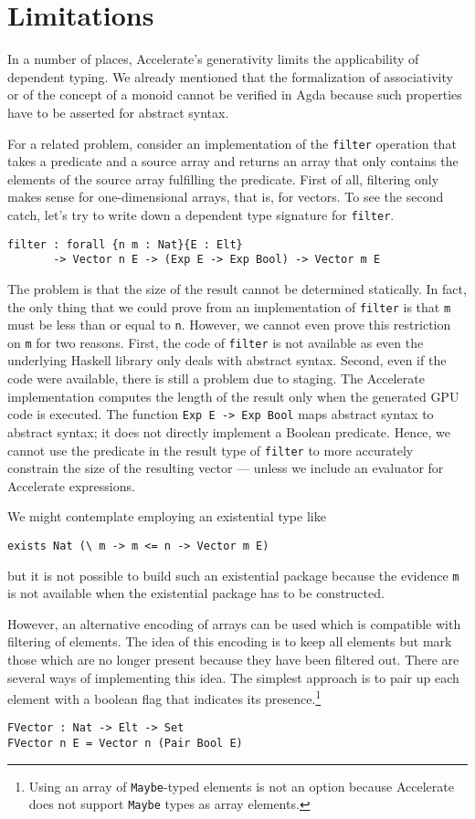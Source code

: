 \documentclass{llncs}
\begin{document}
\section{Limitations}
\label{sec:limitations}

In a number of places, Accelerate's generativity limits the
applicability of dependent typing. We already mentioned that the
formalization of associativity or of the concept of a monoid cannot be
verified in Agda because such properties have to be asserted for abstract syntax.

For a related problem, consider an implementation of the \texttt{filter}
operation that takes a predicate and a source array and returns an
array that only contains the elements of the source array fulfilling
the predicate.  First of all, filtering only makes sense for
one-dimensional arrays, that is, for vectors. To see the second catch,
let's try to write down a dependent type signature for \texttt{filter}.
\begin{verbatim}
filter : forall {n m : Nat}{E : Elt}
       -> Vector n E -> (Exp E -> Exp Bool) -> Vector m E
\end{verbatim}
The problem is that the size of the result
cannot be determined statically. In fact, the only thing that we could
prove from an implementation of \texttt{filter} is that
\texttt{m} must be less than or equal to \texttt{n}.
However, we cannot even prove this restriction on \texttt{m} for two
reasons. First, the code of \texttt{filter} is not available as even
the underlying Haskell library only deals with abstract
syntax. Second, even if the code were available, there is still a
problem due to staging. The Accelerate implementation computes the length of the result only when the generated GPU code is executed. The function \texttt{Exp E -> Exp Bool} maps abstract syntax to abstract syntax; it does not directly implement a Boolean predicate. Hence, we cannot use the predicate in the result type of \texttt{filter} to more accurately constrain the size of the resulting vector --- unless we include an evaluator for Accelerate expressions. 

We might contemplate employing an existential type like
\begin{verbatim}
exists Nat (\ m -> m <= n -> Vector m E)
\end{verbatim}
but it is not possible to build such an
existential package because the evidence \texttt{m} is not available
when the existential package has to be constructed.

However, an alternative encoding of arrays can be
used which is compatible with filtering of elements. The idea of this
encoding is to keep all elements but mark those which are no longer
present because they have been filtered out.
There are several ways of implementing this idea. The simplest
approach is to pair up each element with a boolean flag that indicates
its presence.\footnote{Using an array of \texttt{Maybe}-typed elements is not an option
  because Accelerate does not support \texttt{Maybe} types as array elements.}
\begin{verbatim}
FVector : Nat -> Elt -> Set
FVector n E = Vector n (Pair Bool E)
\end{verbatim}
\end{document}
